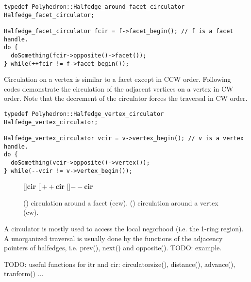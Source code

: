 \begin{lstlisting}
typedef Polyhedron::Halfedge_around_facet_circulator Halfedge_facet_circulator;

Halfedge_facet_circulator fcir = f->facet_begin(); // f is a facet handle.
do {
  doSomething(fcir->opposite()->facet());
} while(++fcir != f->facet_begin());
\end{lstlisting}

Circulation on a vertex is similar to a facet except in CCW order.
Following codes demonstrate the circulation of the adjacent vertices
on a vertex in CW order. Note that the decrement of the circulator
forces the traversal in CW order. 
\begin{lstlisting}
typedef Polyhedron::Halfedge_vertex_circulator Halfedge_vertex_circulator;

Halfedge_vertex_circulator vcir = v->vertex_begin(); // v is a vertex handle.
do {
  doSomething(vcir->opposite()->vertex());
} while(--vcir != v->vertex_begin());
\end{lstlisting}

\begin{figure}[htb]
    \centering
    []{\textbf{cir}}
    \psfrag{++}[]{\textbf{\scriptsize $++$cir}}
    \psfrag{--}[]{\textbf{\scriptsize $--$cir}}
    \caption{(\IL) circulation around a facet (ccw).
             (\IR) circulation around a vertex (cw).}  
    \label{fig:stl_concept}
\end{figure}


A circulator is mostly used to access the local negorhood (i.e. the 
1-ring region). A unorganized traversal is usually done by the
functions of the adjacency pointers of halfedges, i.e. prev(), next() 
and opposite(). TODO: example.

TODO: useful functions for itr and cir: circulatorsize(), distance(), 
advance(), tranform() ...

